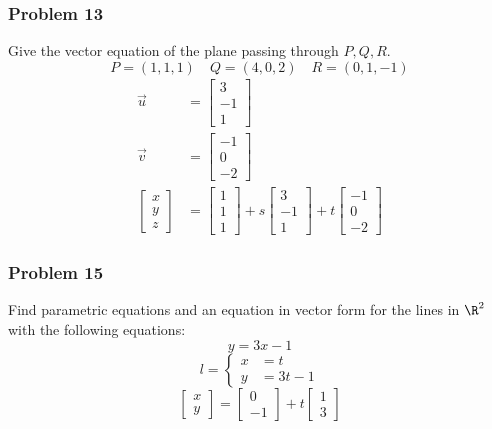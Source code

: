 \documentclass[letterpaper, 12pt]{math}
\begin{document}
\subsubsection*{Problem 13}
Give the vector equation of the plane passing through \( P, Q, R \).
\[ P = (1,1,1) \quad Q = (4,0,2) \quad R = (0,1,-1) \]
\begin{align*}
  \vec{u} &= \begin{bmatrix}3 \\ -1 \\ 1\end{bmatrix} \\
  \vec{v} &= \begin{bmatrix}-1 \\ 0 \\ -2\end{bmatrix} \\
  \begin{bmatrix}x \\ y \\ z\end{bmatrix} &=
    \begin{bmatrix}1 \\ 1 \\ 1\end{bmatrix}+
    s\begin{bmatrix}3 \\ -1 \\ 1\end{bmatrix}+
    t\begin{bmatrix}-1 \\ 0 \\ -2\end{bmatrix}
\end{align*}

\subsubsection*{Problem 15}
Find parametric equations and an equation in vector form for the lines in
\( \R^2 \) with the following equations:
\[ y = 3x-1 \]
\[ l = \begin{cases}
  x &= t \\
  y &= 3t-1
\end{cases} \]
\[ \begin{bmatrix}x \\ y\end{bmatrix} = \begin{bmatrix}0 \\ -1\end{bmatrix}+
  t\begin{bmatrix}1 \\ 3\end{bmatrix} \]
\end{document}

